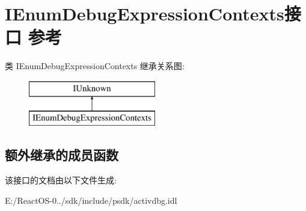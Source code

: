 \hypertarget{interface_i_enum_debug_expression_contexts}{}\section{I\+Enum\+Debug\+Expression\+Contexts接口 参考}
\label{interface_i_enum_debug_expression_contexts}
类 I\+Enum\+Debug\+Expression\+Contexts 继承关系图\+:\begin{figure}[H]
\begin{center}
\leavevmode
\includegraphics[height=2.000000cm]{interface_i_enum_debug_expression_contexts}
\end{center}
\end{figure}
\subsection*{额外继承的成员函数}


该接口的文档由以下文件生成\+:\begin{DoxyCompactItemize}
\item 
E\+:/\+React\+O\+S-\/0../sdk/include/psdk/activdbg.\+idl\end{DoxyCompactItemize}
